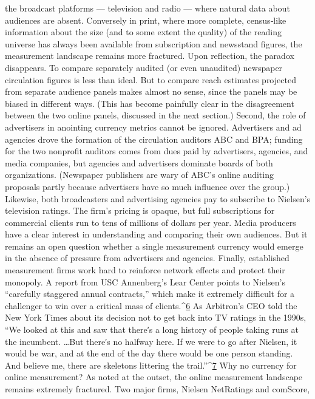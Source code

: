 the broadcast platforms — television and radio — where natural data
about audiences are absent. Conversely in print, where more complete,
census‐like information about the size (and to some extent the quality) of
the reading universe has always been available from subscription and
newsstand figures, the measurement landscape remains more fractured.
Upon reflection, the paradox disappears. To compare separately audited
(or even unaudited) newspaper circulation figures is less than ideal. But to
compare reach estimates projected from separate audience panels makes
almost no sense, since the panels may be biased in different ways. (This
has become painfully clear in the disagreement between the two online
panels, discussed in the next section.)
Second, the role of advertisers in anointing currency metrics cannot be
ignored. Advertisers and ad agencies drove the formation of the
circulation auditors ABC and BPA; funding for the two nonprofit auditors
comes from dues paid by advertisers, agencies, and media companies, but
agencies and advertisers dominate boards of both organizations.
(Newspaper publishers are wary of ABC’s online auditing proposals
partly because advertisers have so much influence over the group.)
Likewise, both broadcasters and advertising agencies pay to subscribe to
Nielsen’s television ratings. The firm’s pricing is opaque, but full
subscriptions for commercial clients run to tens of millions of dollars per
year. Media producers have a clear interest in understanding and
comparing their own audiences. But it remains an open question whether
a single measurement currency would emerge in the absence of pressure
from advertisers and agencies.
Finally, established measurement firms work hard to reinforce network
effects and protect their monopoly. A report from USC Annenberg’s Lear
Center points to Nielsen’s ``carefully staggered annual contracts,'' which
make it extremely difficult for a challenger to win over a critical mass of
clients.^{\href{#endnotes}{6}} As Arbitron’s CEO told the New York Times about its decision not
to get back into TV ratings in the 1990s, ``We looked at this and saw that
thereʹs a long history of people taking runs at the incumbent. \ldots  But
thereʹs no halfway here. If we were to go after Nielsen, it would be war,
and at the end of the day there would be one person standing. And
believe me, there are skeletons littering the trail.''^{\href{#endnotes}{7}}
Why no currency for online measurement?
As noted at the outset, the online measurement landscape remains
extremely fractured. Two major firms, Nielsen NetRatings and comScore,
